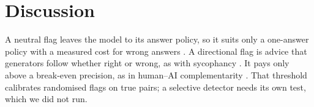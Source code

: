 \section{Discussion}
\label{sec:discussion}

A neutral flag leaves the model to its answer policy, so it suits only a one-answer policy with a measured cost for
wrong answers \citep{wen2025abstention}. A directional flag is advice that generators follow whether
right or wrong, as with sycophancy \citep{sharma2024sycophancy}. It pays only above a break-even precision, as in
human--AI complementarity \citep{bansal2021accurate,mozannar2020defer}. That threshold calibrates randomised flags on
true pairs; a selective detector needs its own test, which we did not run.
